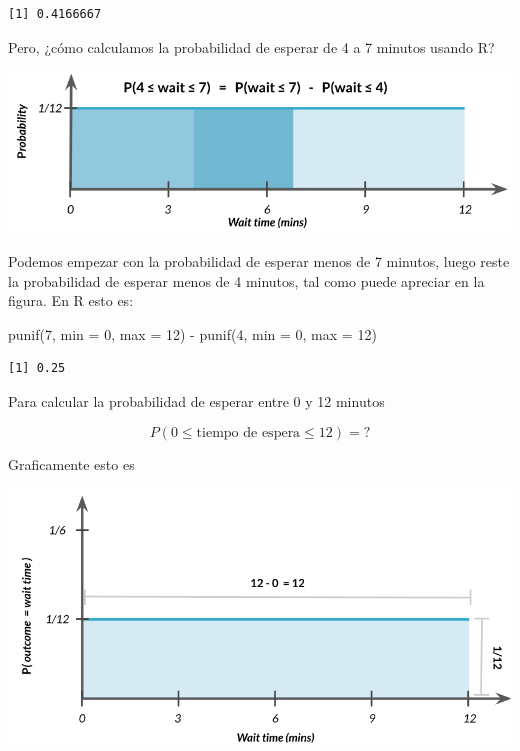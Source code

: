 \documentclass[
  letterpaper,
  DIV=11,
  numbers=noendperiod]{scrreprt}
\newenvironment{Shaded}{\begin{snugshade}}{\end{snugshade}}
\newcommand{\AttributeTok}[1]{\textcolor[rgb]{0.40,0.45,0.13}{#1}}
\newcommand{\DecValTok}[1]{\textcolor[rgb]{0.68,0.00,0.00}{#1}}
\newcommand{\FunctionTok}[1]{\textcolor[rgb]{0.28,0.35,0.67}{#1}}
\newcommand{\NormalTok}[1]{\textcolor[rgb]{0.00,0.23,0.31}{#1}}
\newcommand{\SpecialCharTok}[1]{\textcolor[rgb]{0.37,0.37,0.37}{#1}}
\begin{document}
\begin{verbatim}
[1] 0.4166667
\end{verbatim}

Pero, ¿cómo calculamos la probabilidad de esperar de 4 a 7 minutos
usando R?

\includegraphics{fig34.png}

Podemos empezar con la probabilidad de esperar menos de 7 minutos, luego
reste la probabilidad de esperar menos de 4 minutos, tal como puede
apreciar en la figura. En R esto es:

\begin{Shaded}
\begin{Highlighting}[]
\FunctionTok{punif}\NormalTok{(}\DecValTok{7}\NormalTok{, }\AttributeTok{min =} \DecValTok{0}\NormalTok{, }\AttributeTok{max =} \DecValTok{12}\NormalTok{) }\SpecialCharTok{{-}} \FunctionTok{punif}\NormalTok{(}\DecValTok{4}\NormalTok{, }\AttributeTok{min =} \DecValTok{0}\NormalTok{, }\AttributeTok{max =} \DecValTok{12}\NormalTok{)}
\end{Highlighting}
\end{Shaded}

\begin{verbatim}
[1] 0.25
\end{verbatim}

Para calcular la probabilidad de esperar entre 0 y 12 minutos

\[
P(0\leq \mbox{tiempo de espera}\leq 12) = ?
\]

Graficamente esto es

\includegraphics{fig35.png}
\end{document}
